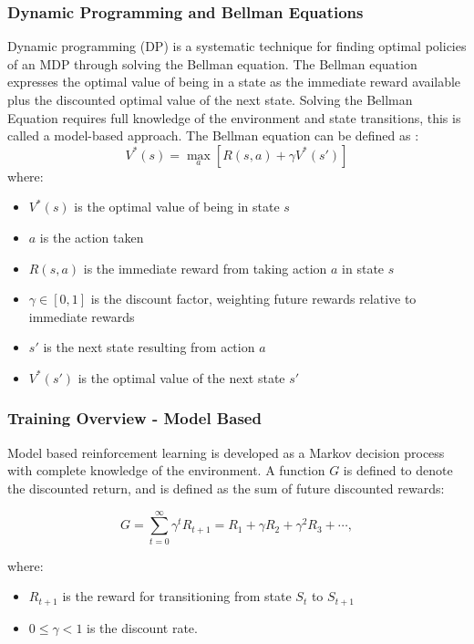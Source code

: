 \subsubsection{Dynamic Programming and Bellman Equations}
Dynamic programming (DP) is a systematic technique for finding optimal policies of an MDP through solving the Bellman equation. The Bellman equation expresses the optimal value of being in a state as the immediate reward available plus the discounted optimal value of the next state. Solving the Bellman Equation requires full knowledge of the environment and state transitions, this is called a model-based approach.
The Bellman equation can be defined as \cite{ljungqvist_sargent_2004}:
\begin{equation}
    V^*(s) = \max_{a} \left[ R(s, a) + \gamma V^*(s') \right]
    \label{eq:bellman}
\end{equation}
where:
\begin{itemize}
    \item $V^*(s)$ is the optimal value of being in state $s$
    \item $a$ is the action taken
    \item $R(s, a)$ is the immediate reward from taking action $a$ in state $s$
    \item $\gamma \in [0,1]$ is the discount factor, weighting future rewards relative to immediate rewards
    \item $s'$ is the next state resulting from action $a$
    \item $V^*(s')$ is the optimal value of the next state $s'$
\end{itemize}

\subsubsection{Training Overview - Model Based}
Model based reinforcement learning is developed as a Markov decision process with complete knowledge of the environment. A function $G$ is defined to denote the discounted return, and is defined as the sum of future discounted rewards:
 
\begin{equation}
    G = \sum_{t=0}^{\infty} \gamma^t R_{t+1} = R_1 + \gamma R_2 + \gamma^2 R_3 + \cdots,
\end{equation}

where:
\begin{itemize}
    \item $R_{t+1}$ is the reward for transitioning from state $S_t$ to $S_{t+1}$
    \item $0 \leq \gamma < 1$ is the discount rate.
\end{itemize}

